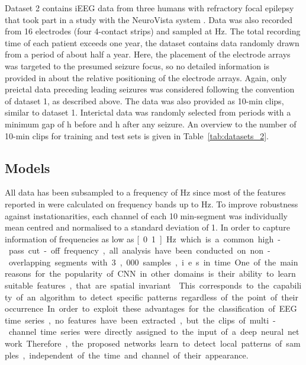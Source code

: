 \documentclass[a4paper, conference]{IEEEtran}
\begin{document}
Dataset 2 \cite{Kuhlmann2018} contains iEEG data from three humans with refractory focal epilepsy that took part in a study with the NeuroVista system \cite{Cook2013}. Data was also recorded from 16 electrodes (four 4-contact strips) and sampled at \unit[400]{Hz}. The total recording time of each patient exceeds one year, the dataset contains data randomly drawn from a period of about half a year. Here, the placement of the electrode arrays was targeted to the presumed seizure focus, so no detailed information is provided in \cite{Cook2013, Kuhlmann2018} about the relative positioning of the electrode arrays. Again, only preictal data preceding leading seizures was considered following the convention of dataset 1, as described above. The data was also provided as 10-min clips, similar to dataset 1. Interictal data was randomly selected from periods with a minimum gap of \unit[3]{h} before and \unit[4]{h} after any seizure. An overview to the number of 10-min clips for training and test sets is given in Table~\ref{tab:datasets_2}.

\subsection{Models}
\label{subsec:models}

All data has been subsampled to a frequency of \unit[200]{Hz} since most of the features reported in \cite{Brinkmann2016} were calculated on frequency bands up to \unit[180]{Hz}. To improve robustness against instationarities, each channel of each 10 min-segment was individually mean centred and normalised to a standard deviation of 1. In order to capture information of frequencies as low as \unit[0.1]{Hz} which is a common high-pass cut-off frequency, all analysis have been conducted on non-overlapping segments with 3,000 samples, i.e. \unit[15]{s} in time. 

One of the main reasons for the popularity of CNN in other domains is their ability to learn suitable features, that are spatial invariant \cite{LeCun2015}. This corresponds to the capability of an algorithm to detect specific patterns regardless of the point of their occurrence. In order to exploit these advantages for the classification of EEG time series, no features have been extracted, but the clips of multi-channel time series were directly assigned to the input of a deep neural network. Therefore, the proposed networks learn to detect local patterns of samples, independent of the time and channel of their appearance. 
\end{document}
